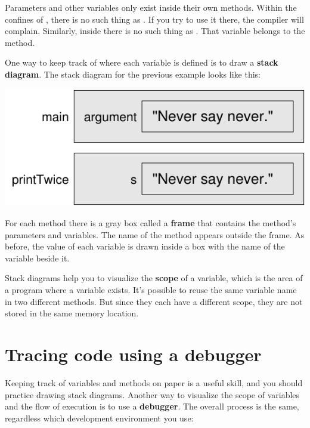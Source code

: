 Parameters and other variables only exist inside their own methods.
Within the confines of , there is no such thing as .
If you try to use it there, the compiler will complain.
Similarly, inside  there is no such thing as .
That variable belongs to the  method.

One way to keep track of where each variable is defined is to draw a {\bf stack diagram}.
The stack diagram for the previous example looks like this:

\begin{center}
\includegraphics{stack.pdf}
\end{center}


For each method there is a gray box called a {\bf frame} that contains the method's parameters and variables.
The name of the method appears outside the frame.
As before, the value of each variable is drawn inside a box with the name of the variable beside it.

Stack diagrams help you to visualize the {\bf scope} of a variable, which is the area of a program where a variable exists.
It's possible to reuse the same variable name in two different methods.
But since they each have a different scope, they are not stored in the same memory location.


\section{Tracing code using a debugger}


Keeping track of variables and methods on paper is a useful skill, and you should practice drawing stack diagrams.
Another way to visualize the scope of variables and the flow of execution is to use a {\bf debugger}.
The overall process is the same, regardless which development environment you use:


